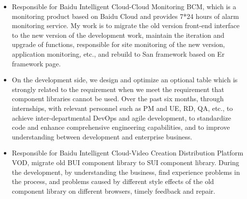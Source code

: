 \documentclass{resume}
\newcommand{\en}[1]{#1}
\newcommand{\zh}[1]{}
\begin{document}
\en{}
\zh{\datedsubsection{\textbf{\href{https://cloud.baidu.com/}{百度智能云（Baidu AI Cloud）}}}{2021/01 -- 2021/08}}
\en{}
\zh{\role{ACG建站与云市场部}{前端研发实习}}
\begin{itemize}
      \item \en{Responsible for Baidu Intelligent Cloud-Cloud Monitoring BCM, which is a monitoring product based on Baidu Cloud and provides 7*24 hours of alarm monitoring service. My work is to migrate the old version front-end interface to the new version of the development work, maintain the iteration and upgrade of functions, responsible for site monitoring of the new version, application monitoring, etc., and rebuild to San framework based on Er framework page.}
            \zh{负责百度智能云-云监控BCM，BCM是依托于百度云的监控产品，提供7*24小时的报警监控服务，本人的工作是对老版本前端界面迁移至新版本的开发工作，维护功能的迭代和升级，负责过新版站点监控，应用监控等，基于Er框架页面重构至San框架。}
      \item \en{On the development side, we design and optimize an optional table which is strongly related to the requirement when we meet the requirement that component libraries cannot be used. Over the past six months, through internships, with relevant personnel such as PM and UE, RD, QA, etc., to achieve inter-departmental DevOps and agile development, to standardize code and enhance comprehensive engineering capabilities, and to improve understanding between development and enterprise business.}
            \zh{在开发方面，遇到无法用组件库的需求，自己设计并优化出一个与需求强相关的可选表格。在过去半年的时间内，通过实习，配合PM和UE，RD，QA等相关人员实现部门间的DevOps和敏捷开发，规范代码并提升综合工程能力，在开发与企业业务之间的理解上也得到提升。}
      \item \en{Responsible for Baidu Intelligent Cloud-Video Creation Distribution Platform VOD, migrate old BUI component library to SUI component library. During the development, by understanding the business, find experience problems in the process, and problems caused by different style effects of the old component library on different browsers, timely feedback and repair.}
            \zh{负责百度智能云-视频创作分发平台VOD，迁移老式BUI组件库至SUI组件库，在开发时，通过了解业务，发现流 程上的体验问题，以及老式组件库对不同浏览器的样式效果不同导致的问题，及时反馈和修复。}
\end{itemize}
\end{document}
